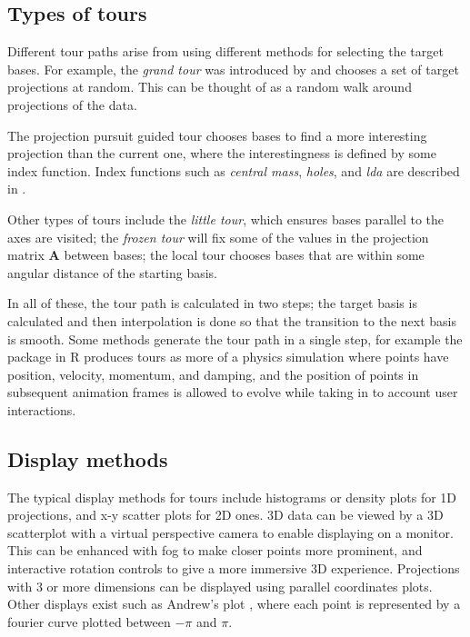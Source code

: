 \hypertarget{types-of-tours}{%
\subsection{Types of tours}\label{types-of-tours}}

Different tour paths arise from using different methods for selecting
the target bases. For example, the \emph{grand tour} was introduced by
\citep{asimov1985grand} and chooses a set of target projections at
random. This can be thought of as a random walk around projections of
the data.

The projection pursuit guided tour chooses bases to find a more
interesting projection than the current one, where the interestingness
is defined by some index function. Index functions such as \emph{central
mass}, \emph{holes}, and \emph{lda} are described in
\citep{cook2007interactive}.

Other types of tours include the \emph{little tour}, which ensures bases
parallel to the axes are visited; the \emph{frozen tour} will fix some
of the values in the projection matrix \(\mathbf A\) between bases; the
local tour chooses bases that are within some angular distance of the
starting basis.

In all of these, the tour path is calculated in two steps; the target
basis is calculated and then interpolation is done so that the
transition to the next basis is smooth. Some methods generate the tour
path in a single step, for example the  package in
R \citep{harrison2022langevitour} produces tours as more of a physics
simulation where points have position, velocity, momentum, and damping,
and the position of points in subsequent animation frames is allowed to
evolve while taking in to account user interactions.

\hypertarget{display-methods}{%
\subsection{Display methods}\label{display-methods}}

The typical display methods for tours include histograms or density
plots for 1D projections, and x-y scatter plots for 2D ones. 3D data can
be viewed by a 3D scatterplot with a virtual perspective camera to
enable displaying on a monitor. This can be enhanced with fog to make
closer points more prominent, and interactive rotation controls to give
a more immersive 3D experience. Projections with 3 or more dimensions
can be displayed using parallel coordinates plots. Other displays exist
such as Andrew's plot \citep{andrews1972plots}, where each point is
represented by a fourier curve plotted between \(-\pi\) and \(\pi\).

